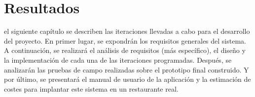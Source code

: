 
\chapter{Resultados}
\label{chap:results}
 el siguiente capítulo se describen las iteraciones llevadas a cabo 
para el desarrollo del proyecto. En primer lugar, se expondrán los requisitos 
generales del sistema. A continuación, se realizará el análisis de requisitos 
(más específico), el diseño y la implementación de cada una de las iteraciones
programadas. Después, se analizarán las pruebas de campo realizadas sobre
el prototipo final construido. Y por último, se presentará el manual de usuario
de la aplicación y la estimación de costes para implantar este sistema en un restaurante real.

